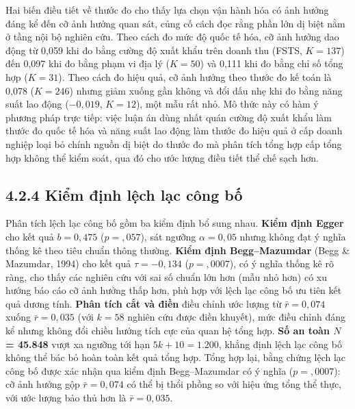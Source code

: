 \documentclass[
  a4paper,
  13pt]{extreport}
\begin{document}
Hai biến điều tiết về thước đo cho thấy lựa chọn vận hành hóa có ảnh
hưởng đáng kể đến cỡ ảnh hưởng quan sát, củng cố cách đọc rằng phần lớn
dị biệt nằm ở tầng nội bộ nghiên cứu. Theo cách đo mức độ quốc tế hóa,
cỡ ảnh hưởng dao động từ 0,059 khi đo bằng cường độ xuất khẩu trên doanh
thu (FSTS, \(K = 137\)) đến 0,097 khi đo bằng phạm vi địa lý
(\(K = 50\)) và 0,111 khi đo bằng chỉ số tổng hợp (\(K = 31\)). Theo
cách đo hiệu quả, cỡ ảnh hưởng theo thước đo kế toán là 0,078
(\(K = 246\)) nhưng giảm xuống gần không và đổi dấu nhẹ khi đo bằng năng
suất lao động (\(-0{,}019\), \(K = 12\)), một mẫu rất nhỏ. Mô thức này
có hàm ý phương pháp trực tiếp: việc luận án dùng nhất quán cường độ
xuất khẩu làm thước đo quốc tế hóa và năng suất lao động làm thước đo
hiệu quả ở cấp doanh nghiệp loại bỏ chính nguồn dị biệt do thước đo mà
phân tích tổng hợp cấp tổng hợp không thể kiểm soát, qua đó cho ước
lượng điều tiết thể chế sạch hơn.

\hypertarget{kiux1ec3m-ux111ux1ecbnh-lux1ec7ch-lux1ea1c-cuxf4ng-bux1ed1}{%
\subsection{4.2.4 Kiểm định lệch lạc công
bố}\label{kiux1ec3m-ux111ux1ecbnh-lux1ec7ch-lux1ea1c-cuxf4ng-bux1ed1}}

Phân tích lệch lạc công bố gồm ba kiểm định bổ sung nhau. \textbf{Kiểm
định Egger} cho kết quả \(b = 0{,}475\) (\(p = {,}057\)), sát ngưỡng
\(\alpha = 0{,}05\) nhưng không đạt ý nghĩa thống kê theo tiêu chuẩn
thông thường. \textbf{Kiểm định Begg--Mazumdar} (Begg \& Mazumdar, 1994)
cho kết quả \(\tau = -0{,}134\) (\(p = {,}0007\)), có ý nghĩa thống kê
rõ ràng, cho thấy các nghiên cứu với sai số chuẩn lớn hơn (mẫu nhỏ hơn)
có xu hướng báo cáo cỡ ảnh hưởng thấp hơn, phù hợp với lệch lạc công bố
ưu tiên kết quả dương tính. \textbf{Phân tích cắt và điền} điều chỉnh
ước lượng từ \(\bar{r} = 0{,}074\) xuống \(\bar{r} = 0{,}035\) (với
\(k = 58\) nghiên cứu được điền khuyết), mức điều chỉnh đáng kể nhưng
không đổi chiều hướng tích cực của quan hệ tổng hợp. \textbf{Số an toàn
\(N\) = 45.848} vượt xa ngưỡng tới hạn \(5k + 10 = 1.200\), khẳng định
lệch lạc công bố không thể bác bỏ hoàn toàn kết quả tổng hợp. Tổng hợp
lại, bằng chứng lệch lạc công bố được xác nhận qua kiểm định
Begg--Mazumdar có ý nghĩa (\(p = {,}0007\)): cỡ ảnh hưởng gộp
\(\bar{r} = 0{,}074\) có thể bị thổi phồng so với hiệu ứng tổng thể
thực, với ước lượng bảo thủ hơn là \(\bar{r} = 0{,}035\).
\end{document}
